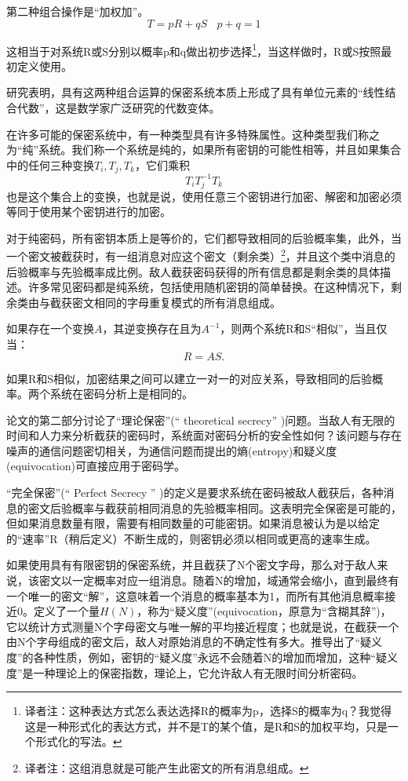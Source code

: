 \documentclass[]{article}
\begin{document}
第二种组合操作是“加权加”。\[T=pR+qS \ \ \ \  p+q=1\]

这相当于对系统R或S分别以概率p和q做出初步选择\footnote{译者注：这种表达方式怎么表达选择R的概率为p，选择S的概率为q？我觉得这是一种形式化的表达方式，并不是T的某个值，是R和S的加权平均，只是一个形式化的写法。}，当这样做时，R或S按照最初定义使用。


研究表明，具有这两种组合运算的保密系统本质上形成了具有单位元素的“线性结合代数”，这是数学家广泛研究的代数变体。


在许多可能的保密系统中，有一种类型具有许多特殊属性。这种类型我们称之为“纯”系统。我们称一个系统是纯的，如果所有密钥的可能性相等，并且如果集合中的任何三种变换$T_i,T_j,T_k$，它们乘积	
\[T_iT^{-1}_jT_k\]
也是这个集合上的变换，也就是说，使用任意三个密钥进行加密、解密和加密必须等同于使用某个密钥进行的加密。
	
对于纯密码，所有密钥本质上是等价的，它们都导致相同的后验概率集，此外，当一个密文被截获时，有一组消息对应这个密文（剩余类）\footnote{译者注：这组消息就是可能产生此密文的所有消息组成。}，并且这个类中消息的后验概率与先验概率成比例。敌人截获密码获得的所有信息都是剩余类的具体描述。许多常见密码都是纯系统，包括使用随机密钥的简单替换。在这种情况下，剩余类由与截获密文相同的字母重复模式的所有消息组成。

如果存在一个变换$A$，其逆变换存在且为$A^{-1}$，则两个系统R和S“相似”，当且仅当：
\[R=AS.\]

如果R和S相似，加密结果之间可以建立一对一的对应关系，导致相同的后验概率。两个系统在密码分析上是相同的。


论文的第二部分讨论了“理论保密”(“ theoretical secrecy” )问题。当敌人有无限的时间和人力来分析截获的密码时，系统面对密码分析的安全性如何？该问题与存在噪声的通信问题密切相关，为通信问题而提出的熵(entropy)和疑义度(equivocation)可直接应用于密码学。


“完全保密”(“ Perfect Secrecy ” )的定义是要求系统在密码被敌人截获后，各种消息的密文后验概率与截获前相同消息的先验概率相同。这表明完全保密是可能的，但如果消息数量有限，需要有相同数量的可能密钥。如果消息被认为是以给定的“速率”R（稍后定义）不断生成的，则密钥必须以相同或更高的速率生成。


如果使用具有有限密钥的保密系统，并且截获了N个密文字母，那么对于敌人来说，该密文以一定概率对应一组消息。随着N的增加，域通常会缩小，直到最终有一个唯一的密文“解”，这意味着一个消息的概率基本为1，而所有其他消息概率接近0。定义了一个量$H(N)$，称为“疑义度”(equivocation，原意为“含糊其辞”)，它以统计方式测量N个字母密文与唯一解的平均接近程度；也就是说，在截获一个由N个字母组成的密文后，敌人对原始消息的不确定性有多大。推导出了“疑义度”的各种性质，例如，密钥的“疑义度”永远不会随着N的增加而增加，这种“疑义度”是一种理论上的保密指数，理论上，它允许敌人有无限时间分析密码。
\end{document}
